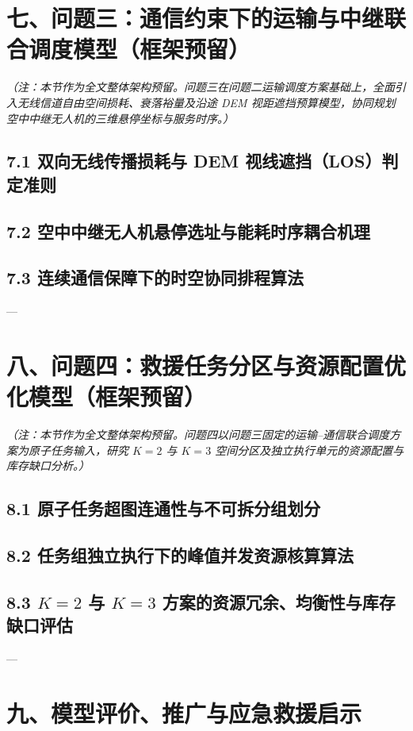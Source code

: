 \documentclass[12pt,a4paper,UTF8]{ctexart}
\begin{document}
\section{七、问题三：通信约束下的运输与中继联合调度模型（框架预留）}
\emph{（注：本节作为全文整体架构预留。问题三在问题二运输调度方案基础上，全面引入无线信道自由空间损耗、衰落裕量及沿途 DEM 视距遮挡预算模型，协同规划空中中继无人机的三维悬停坐标与服务时序。）}

\subsection{7.1 双向无线传播损耗与 DEM 视线遮挡（LOS）判定准则}
\subsection{7.2 空中中继无人机悬停选址与能耗时序耦合机理}
\subsection{7.3 连续通信保障下的时空协同排程算法}

---

\section{八、问题四：救援任务分区与资源配置优化模型（框架预留）}
\emph{（注：本节作为全文整体架构预留。问题四以问题三固定的运输--通信联合调度方案为原子任务输入，研究 $K=2$ 与 $K=3$ 空间分区及独立执行单元的资源配置与库存缺口分析。）}

\subsection{8.1 原子任务超图连通性与不可拆分组划分}
\subsection{8.2 任务组独立执行下的峰值并发资源核算算法}
\subsection{8.3 $K=2$ 与 $K=3$ 方案的资源冗余、均衡性与库存缺口评估}

---

\section{九、模型评价、推广与应急救援启示}
\end{document}
